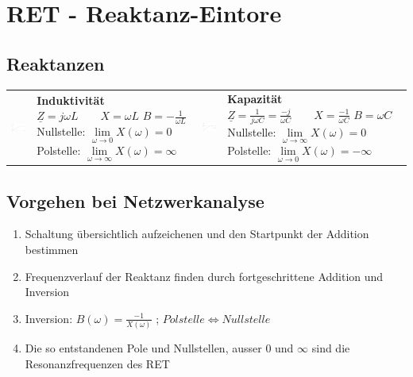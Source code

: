 \section{RET - Reaktanz-Eintore}
\subsection{Reaktanzen}
	\begin{tabular}{ll ll}
		\parbox{4cm}{
			\includegraphics[width=3.5cm]{./bilder/Induktivitaet}
			}
			& \parbox{5cm}{
				\textbf{Induktivität} \\
				$\underline{Z}=j\omega L \qquad X=\omega L$\\
				$B=-\frac{1}{\omega L}$\\
				Nullstelle: $\lim\limits_{\omega \rightarrow 0} X(\omega) = 0$ \\
				Polstelle: $\lim\limits_{\omega \rightarrow \infty} X(\omega) = \infty$ \\
			}
			
			& \parbox{4cm}{
			\includegraphics[width=3.5cm]{./bilder/Kapazitaet}
			}
			& \parbox{5cm}{
				\textbf{Kapazität} \\
				$\underline{Z}=\frac{1}{j\omega C}=\frac{-j}{\omega C} \qquad X=\frac{-1}{\omega C}$\\
				$B=\omega C$ \\
				Nullstelle: $\lim\limits_{\omega \rightarrow \infty} X(\omega) = 0$ \\
				Polstelle: $\lim\limits_{\omega \rightarrow 0} X(\omega) = -\infty$ \\
			}
	\end{tabular}
	
\subsection{Vorgehen bei Netzwerkanalyse}
	\begin{enumerate}{\setlength{\itemsep}{0cm}\setlength{\parsep}{0cm} \setlength{\topsep}{0cm}}
      \item Schaltung übersichtlich aufzeichenen und den Startpunkt der Addition bestimmen
      \item Frequenzverlauf der Reaktanz finden durch fortgeschrittene Addition und Inversion
      \item Inversion: $B(\omega)=\frac{-1}{X(\omega)}$ ; $Polstelle \Longleftrightarrow Nullstelle$
      \item Die so entstandenen Pole und Nullstellen, ausser 0 und $\infty$ sind die Resonanzfrequenzen des RET
    \end{enumerate}
	
